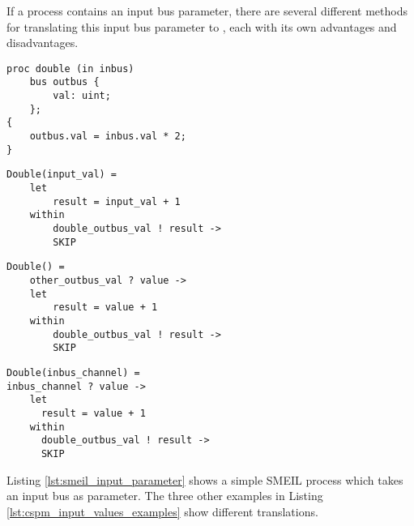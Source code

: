 If a process contains an input bus parameter, there are several different methods for translating this input bus parameter to \cspm{}, each with its own advantages and disadvantages.\\

\begin{minipage}[t]{.98\linewidth}
    \centering
\begin{minipage}[t]{0.45\linewidth}
  \begin{verbatim}
proc double (in inbus)
    bus outbus {
        val: uint;
    };
{
    outbus.val = inbus.val * 2;
}
  \end{verbatim}
  \label{lst:smeil_input_parameter}
\end{minipage}
\hspace{0.6cm}
\begin{minipage}[t]{0.45\linewidth}
\begin{verbatim}
Double(input_val) =
    let
        result = input_val + 1
    within
        double_outbus_val ! result ->
        SKIP
\end{verbatim}
\label{lst:cspm_input_value}
\end{minipage}
\hspace{0.6cm}
\vspace{0.5cm}
\newline
\begin{minipage}[t]{0.45\linewidth}
\begin{verbatim}
Double() =
    other_outbus_val ? value ->
    let
        result = value + 1
    within
        double_outbus_val ! result ->
        SKIP
\end{verbatim}
\label{lst:cspm_no_input}
\end{minipage}
\hspace{0.6cm}
\begin{minipage}[t]{0.45\linewidth}
\begin{verbatim}
Double(inbus_channel) =
inbus_channel ? value ->
    let
      result = value + 1
    within
      double_outbus_val ! result ->
      SKIP
\end{verbatim}
\label{lst:cspm_channel_reads_input}
\end{minipage}
\vspace{0.3cm}
\label{lst:cspm_input_values_examples}
\vspace{1cm}
\end{minipage}
Listing \ref{lst:smeil_input_parameter} shows a simple SMEIL process which takes an input bus as parameter. The three other examples in Listing \ref{lst:cspm_input_values_examples} show different translations.\\

